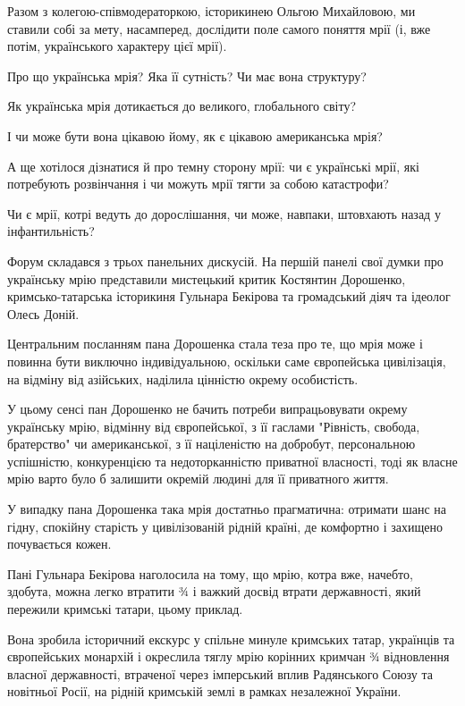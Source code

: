 Разом з колегою-співмодераторкою, історикинею Ольгою Михайловою, ми ставили
собі за мету, насамперед, дослідити поле самого поняття мрії (і, вже потім,
українського характеру цієї мрії). 

\begin{zznagolos}
Про що українська мрія? Яка її сутність? Чи має вона структуру? 

Як українська мрія дотикається до великого, глобального світу?

І чи може бути вона цікавою йому, як є цікавою американська мрія? 

А ще хотілося дізнатися й про темну сторону мрії: чи є українські мрії, які
потребують розвінчання і чи можуть мрії тягти за собою катастрофи? 

Чи є мрії, котрі ведуть до дорослішання, чи може, навпаки, штовхають назад у
інфантильність?
\end{zznagolos}

Форум складався з трьох панельних дискусій. На першій панелі свої думки про
українську мрію представили мистецький критик Костянтин Дорошенко,
кримсько-татарська історикиня Гульнара Бекірова та громадський діяч та ідеолог
Олесь Доній. 

Центральним посланням пана Дорошенка стала теза про те, що мрія може і повинна
бути виключно індивідуальною, оскільки саме європейська цивілізація, на відміну
від азійських, наділила цінністю окрему особистість. 

У цьому сенсі пан Дорошенко не бачить потреби випрацьовувати окрему українську
мрію, відмінну від європейської, з її гаслами "Рівність, свобода, братерство"
чи американської, з її націленістю на добробут, персональною успішністю,
конкуренцією та недоторканністю приватної власності, тоді як власне мрію варто
було б залишити окремій людині для її приватного життя. 

У випадку пана Дорошенка така мрія достатньо прагматична: отримати шанс на
гідну, спокійну старість у цивілізованій рідній країні, де комфортно і захищено
почувається кожен.

Пані Гульнара Бекірова наголосила на тому, що мрію, котра вже, начебто,
здобута, можна легко втратити ¾ і важкий досвід втрати державності, який
пережили кримські татари, цьому приклад. 

Вона зробила історичний екскурс у спільне минуле кримських татар, українців та
європейських монархій і окреслила тяглу мрію корінних кримчан ¾ відновлення
власної державності, втраченої через імперський вплив Радянського Союзу та
новітньої Росії, на рідній кримській землі в рамках незалежної України.

